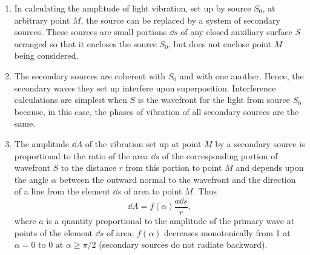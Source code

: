 \begin{enumerate}[label = (\alph*)]
\item In calculating the amplitude of light vibration, set up by source $S_{0}$, at arbitrary point $M$, the source can be replaced by a system of secondary sources. These sources are small portions $\dd s$ of any closed auxiliary surface $S$ arranged so that it encloses the source $S_{0}$, but does not enclose point $M$ being considered.
\item The secondary sources are coherent with $S_{0}$ and with one another. Hence, the secondary waves they set up interfere upon superposition. Interference calculations are simplest when $S$ is the wavefront for the light from source $S_{0}$ because, in this case, the phases of vibration of all secondary sources are the same.
\item The amplitude $\dd A$ of the vibration set up at point $M$ by a secondary source is proportional to the ratio of the area $\dd s$ of the corresponding portion of wavefront $S$ to the distance $r$ from this portion to point $M$ and depends upon the angle $\alpha$ between the outward normal to the wavefront and the direction of a line from the element $\dd s$ of area to point $M$. Thus 
\begin{equation*}%
\dd A = f\!(\alpha) \frac{a \dd s}{r},
\end{equation*}
where $a$ is a quantity proportional to the amplitude of the primary wave at points of the element $\dd s$ of area; $f\!(\alpha)$ decreases monotonically from 1 at $\alpha = 0$ to 0 at $\alpha \geqslant \pi/2$ (secondary sources do not radiate backward).

\end{enumerate}
